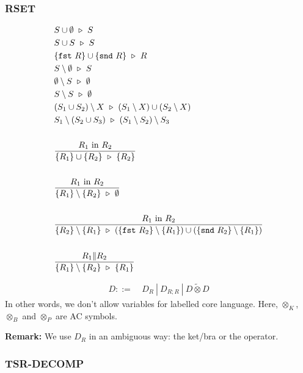 \subsubsection*{\textsf{RSET}}
\begin{align*}
  & S \cup \emptyset \ \triangleright\  S \\
  & S \cup S \ \triangleright\  S \\
  & \{ \texttt{fst}\ R \} \cup \{ \texttt{snd}\ R \} \ \triangleright\  R \\
  & S \setminus \emptyset \ \triangleright\  S \\
  & \emptyset \setminus S \ \triangleright\  \emptyset \\
  & S \setminus S \ \triangleright\  \emptyset \\
  & (S_1 \cup S_2) \setminus X \ \triangleright\  (S_1 \setminus X) \cup (S_2 \setminus X) \\
  & S_1 \setminus (S_2 \cup S_3) \ \triangleright\  (S_1 \setminus S_2) \setminus S_3 \\
  \\
  & \frac{ R_1 \textrm{ in } R_2 }{ \{ R_1 \} \cup \{ R_2 \} \ \triangleright\  \{ R_2 \} } \\
  \\
  & \frac{ R_1 \textrm{ in } R_2 }{ \{ R_1 \} \setminus \{ R_2 \} \ \triangleright\  \emptyset } \\
  \\
  & \frac{ R_1 \textrm{ in } R_2 }{ \{R_2\} \setminus \{R_1\} \ \triangleright\  (\{\texttt{fst}\ R_2\} \setminus \{R_1\}) \cup (\{\texttt{snd}\ R_2\} \setminus \{R_1\})} \\
  \\
  & \frac{R_1 \| R_2}{ \{ R_1 \} \setminus \{ R_2 \} \ \triangleright\  \{ R_1 \}} 
\end{align*}

\begin{definition}
  \begin{align*}
    D ::=\ & D_{R}\ |\ D_{R; R}\ |\ D \tilde{\otimes} D
  \end{align*}
  In other words, we don't allow variables for labelled core language.
  Here, $\otimes_K$, $\otimes_B$ and $\otimes_P$ are AC symbols.
\end{definition}

\textbf{Remark: } We use $D_R$ in an ambiguous way: the ket/bra or the operator.

\subsubsection*{\textsf{TSR-DECOMP}}

